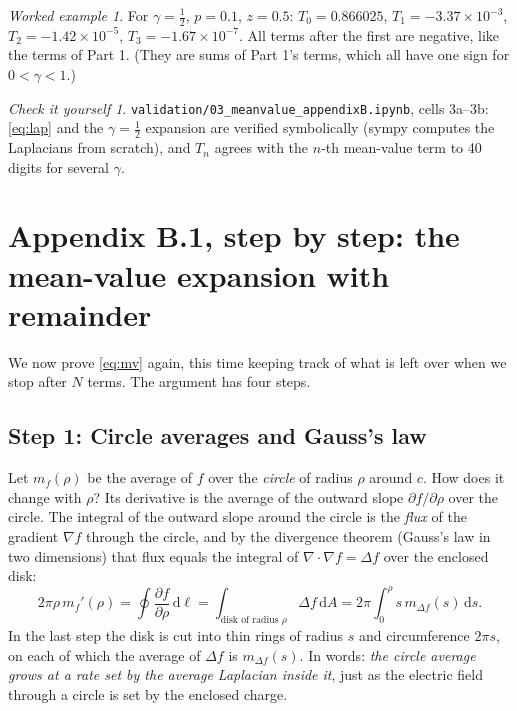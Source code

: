 \documentclass[11pt,a4paper]{article}
\theoremstyle{remark}
\newtheorem*{example}{Worked example}
\newtheorem*{checkit}{Check it yourself}
\newcommand{\dd}{\mathrm{d}}
\newcommand{\nb}[1]{\texttt{validation/#1}}
\begin{document}
\begin{example}
For $\gamma=\tfrac12$, $p=0.1$, $z=0.5$: $T_0=0.866025$, $T_1=-3.37\times10^{-3}$,
$T_2=-1.42\times10^{-5}$, $T_3=-1.67\times10^{-7}$. All terms after the first are negative, like
the terms of Part 1. (They are sums of Part 1's terms, which all have one sign for $0<\gamma<1$.)
\end{example}

\begin{checkit}
\nb{03\_meanvalue\_appendixB.ipynb}, cells 3a--3b: \eqref{eq:lap} and the $\gamma=\tfrac12$
expansion are verified symbolically (sympy computes the Laplacians from scratch), and $T_n$ agrees
with the $n$-th mean-value term to 40 digits for several $\gamma$.
\end{checkit}

\section{Appendix B.1, step by step: the mean-value expansion with remainder}
\label{sec:proof}

We now prove \eqref{eq:mv} again, this time keeping track of what is left over when we stop after
$N$ terms. The argument has four steps.

\subsection*{Step 1: Circle averages and Gauss's law}

Let $m_f(\rho)$ be the average of $f$ over the \emph{circle} of radius $\rho$ around $c$. How does
it change with $\rho$? Its derivative is the average of the outward slope $\partial f/\partial\rho$
over the circle. The integral of the outward slope around the circle is the \emph{flux} of the
gradient $\nabla f$ through the circle, and by the divergence theorem (Gauss's law in two
dimensions) that flux equals the integral of $\nabla\cdot\nabla f=\Delta f$ over the enclosed disk:
\[
  2\pi\rho\,m_f'(\rho)=\oint\frac{\partial f}{\partial\rho}\,\dd\ell
  =\int_{\text{disk of radius }\rho}\Delta f\,\dd A
  =2\pi\int_0^\rho s\,m_{\Delta f}(s)\,\dd s .
\]
In the last step the disk is cut into thin rings of radius $s$ and circumference $2\pi s$, on each
of which the average of $\Delta f$ is $m_{\Delta f}(s)$. In words: \emph{the circle average grows at
a rate set by the average Laplacian inside it}, just as the electric field through a circle is set
by the enclosed charge.
\end{document}
